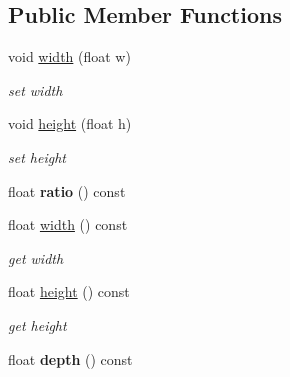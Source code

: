 \subsection*{Public Member Functions}
\begin{DoxyCompactItemize}
\item 
\hypertarget{structvsr_1_1_lens_ae61564dee998df1c90e51dedac4e6351}{void \hyperlink{structvsr_1_1_lens_ae61564dee998df1c90e51dedac4e6351}{width} (float w)}\label{structvsr_1_1_lens_ae61564dee998df1c90e51dedac4e6351}

\begin{DoxyCompactList}\small\item\em set width \end{DoxyCompactList}\item 
\hypertarget{structvsr_1_1_lens_a4da1c1a30c6e6a3449894d456f3a7ab5}{void \hyperlink{structvsr_1_1_lens_a4da1c1a30c6e6a3449894d456f3a7ab5}{height} (float h)}\label{structvsr_1_1_lens_a4da1c1a30c6e6a3449894d456f3a7ab5}

\begin{DoxyCompactList}\small\item\em set height \end{DoxyCompactList}\item 
\hypertarget{structvsr_1_1_lens_a8b1406349c4cda3e080f13f246a12b51}{float {\bfseries ratio} () const }\label{structvsr_1_1_lens_a8b1406349c4cda3e080f13f246a12b51}

\item 
\hypertarget{structvsr_1_1_lens_a1f9329bb7d23cf6ebac6817bbdb8fe64}{float \hyperlink{structvsr_1_1_lens_a1f9329bb7d23cf6ebac6817bbdb8fe64}{width} () const }\label{structvsr_1_1_lens_a1f9329bb7d23cf6ebac6817bbdb8fe64}

\begin{DoxyCompactList}\small\item\em get width \end{DoxyCompactList}\item 
\hypertarget{structvsr_1_1_lens_a12beb97b16c90b46a9e39ab670b938e8}{float \hyperlink{structvsr_1_1_lens_a12beb97b16c90b46a9e39ab670b938e8}{height} () const }\label{structvsr_1_1_lens_a12beb97b16c90b46a9e39ab670b938e8}

\begin{DoxyCompactList}\small\item\em get height \end{DoxyCompactList}\item 
\hypertarget{structvsr_1_1_lens_ad31c58f733570b78776f88f7ac6255f0}{float {\bfseries depth} () const }\label{structvsr_1_1_lens_ad31c58f733570b78776f88f7ac6255f0}


\end{DoxyCompactItemize}
